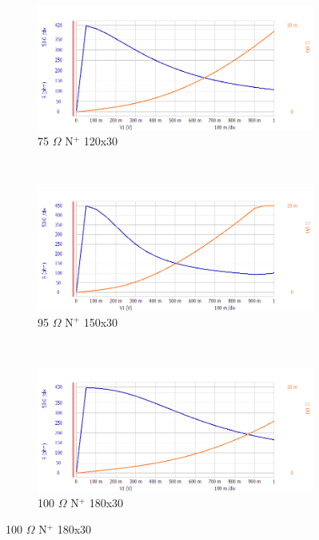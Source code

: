 \documentclass[letter,12pt]{article}
\begin{document}
			\begin{figure}[h!]
				\centering
				\begin{subfigure}[b]{.45\textwidth}
					\includegraphics[width=\textwidth]{./Images/Probe_Test/R_NPlus_120x30.png}
					\caption{75 $\Omega$ N$^+$ 120x30}
				\end{subfigure}
				~
				\begin{subfigure}[b]{.45\textwidth}
					\includegraphics[width=\textwidth]{./Images/Probe_Test/R_NPlus_150x30.png}
					\caption{95 $\Omega$ N$^+$ 150x30}
				\end{subfigure}
				~
				\begin{subfigure}[b]{.45\textwidth}
					\includegraphics[width=\textwidth]{./Images/Probe_Test/R_NPlus_180x30.png}
					\caption{100 $\Omega$ N$^+$ 180x30}
				\end{subfigure}

\end{figure}
\end{document}
